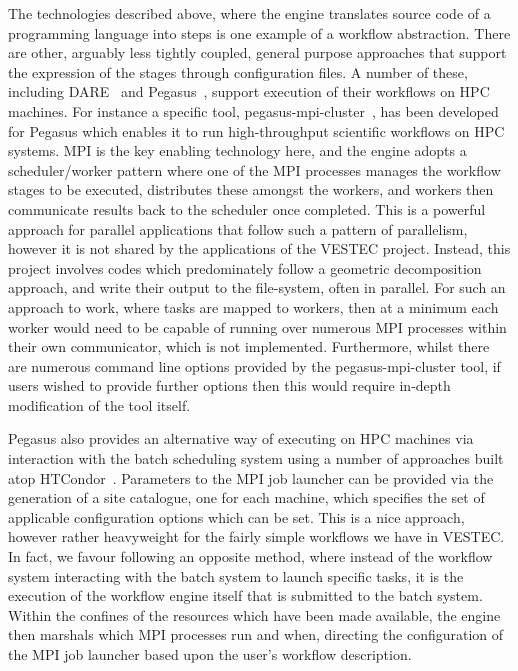 \documentclass[conference]{IEEEtran}
\begin{document}
The technologies described above, where the engine translates source code of a programming language into steps is one example of a workflow abstraction. There are other, arguably less tightly coupled, general purpose approaches that support the expression of the stages through configuration files. A number of these, including DARE~\cite{klampanos2019dare} and Pegasus~\cite{deelman2015pegasus}, support execution of their workflows on HPC machines. For instance a specific tool, pegasus-mpi-cluster~\cite{rynge2012enabling}, has been developed for Pegasus which enables it to run high-throughput scientific workflows on HPC systems. MPI is the key enabling technology here, and the engine adopts a scheduler/worker pattern where one of the MPI processes manages the workflow stages to be executed, distributes these amongst the workers, and workers then communicate results back to the scheduler once completed. This is a powerful approach for parallel applications that follow such a pattern of parallelism, however it is not shared by the applications of the VESTEC project. Instead, this project involves codes which predominately follow a geometric decomposition approach, and write their output to the file-system, often in parallel. For such an approach to work, where tasks are mapped to workers, then at a minimum each worker would need to be capable of running over numerous MPI processes within their own communicator, which is not implemented. Furthermore, whilst there are numerous command line options provided by the pegasus-mpi-cluster tool, if users wished to provide further options then this would require in-depth modification of the tool itself.

Pegasus also provides an alternative way of executing on HPC machines via interaction with the batch scheduling system using a number of approaches built atop HTCondor~\cite{thain2005distributed}. Parameters to the MPI job launcher can be provided via the generation of a site catalogue, one for each machine, which specifies the set of applicable configuration options which can be set. This is a nice approach, however rather heavyweight for the fairly simple workflows we have in VESTEC. In fact, we favour following an opposite method, where instead of the workflow system interacting with the batch system to launch specific tasks, it is the execution of the workflow engine itself that is submitted to the batch system. Within the confines of the resources which have been made available, the engine then marshals which MPI processes run and when, directing the configuration of the MPI job launcher based upon the user's workflow description.
\end{document}
